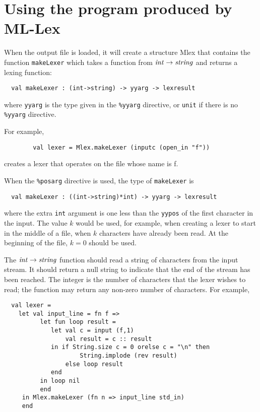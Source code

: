 \section{Using the program produced by ML-Lex}

When the output file is loaded, it will create a structure Mlex that
contains the function {\tt makeLexer} which takes a function from
${\it int} \rightarrow {\it string}$ and returns a lexing function:

\begin{verbatim}
  val makeLexer : (int->string) -> yyarg -> lexresult
\end{verbatim}
where {\tt yyarg} is the type given in the {\tt \%yyarg} directive,
or {\tt unit} if there is no {\tt \%yyarg} directive.

For example,

\begin{verbatim}
        val lexer = Mlex.makeLexer (inputc (open_in "f"))
\end{verbatim}

creates a lexer that operates on the file whose name is f.

When the {\tt \%posarg} directive is used, the type of
{\tt makeLexer} is 
\begin{verbatim}
  val makeLexer : ((int->string)*int) -> yyarg -> lexresult
\end{verbatim}
where the extra {\tt int} argument is one less than the {\tt yypos}
of the first character in the input.  The value $k$ would be used,
for example, when creating
a lexer to start in the middle of a file, when $k$ characters have
already been read.  At the beginning of the file, $k=0$ should be used.

The ${\it int} \rightarrow {\it string}$ function
should read a string of characters
from the input stream.  It should return a null string to indicate
that the end of the stream has been reached.  The integer is the
number of characters that the lexer wishes to read; the function may
return any non-zero number of characters.  For example, 

\begin{verbatim}
  val lexer = 
    let val input_line = fn f =>
          let fun loop result =
             let val c = input (f,1)
                 val result = c :: result
             in if String.size c = 0 orelse c = "\n" then
                     String.implode (rev result)
                 else loop result
             end
          in loop nil
          end
     in Mlex.makeLexer (fn n => input_line std_in)
     end
\end{verbatim}

